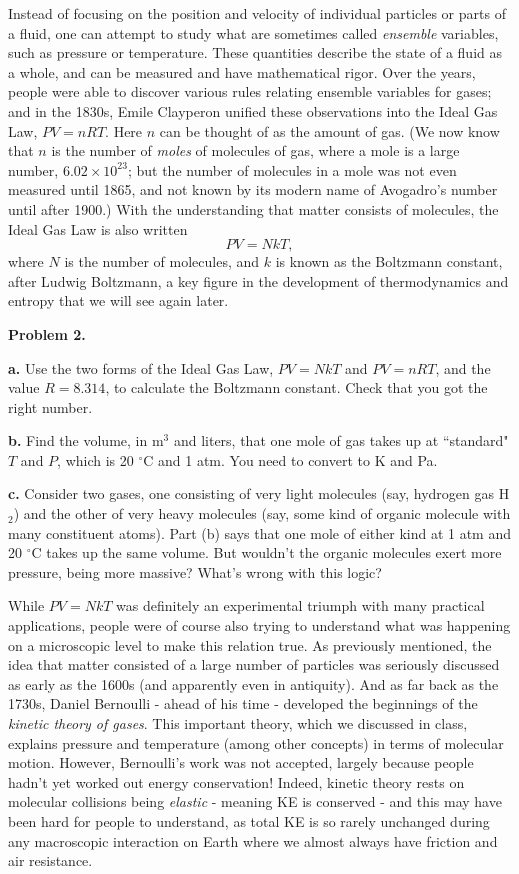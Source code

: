 \documentclass[12pt]{article}
\begin{document}
Instead of focusing on the position and velocity of individual particles or parts of a fluid, one can attempt to study what are sometimes called \textit{ensemble} variables, such as pressure or temperature. These quantities describe the state of a fluid as a whole, and can be measured and have mathematical rigor.  Over the years, people were able to discover various rules relating ensemble variables for gases; and in the 1830s, Emile Clayperon unified these observations into the Ideal Gas Law, $PV=nRT$. Here $n$ can be thought of as the amount of gas. (We now know that $n$ is the number of \textit{moles} of molecules of gas, where a mole is a large number, $6.02 \times 10^{23}$; but the number of molecules in a mole was not even measured until 1865, and not known by its modern name of Avogadro's number until after 1900.) With the understanding that matter consists of molecules, the Ideal Gas Law is also written 
\begin{equation}
PV=NkT, 
\end{equation}
where $N$ is the number of molecules, and $k$ is known as the Boltzmann constant, after Ludwig Boltzmann, a key figure in the development of thermodynamics and entropy that we will see again later.

\textbf{Problem 2. }

\textbf{a.} Use the two forms of the Ideal Gas Law, $PV=NkT$ and $PV=nRT$, and the value $R=8.314$, to calculate the Boltzmann constant. Check that you got the right number.

\textbf{b.} Find the volume, in m$^3$ and liters, that one mole of gas takes up at ``standard" $T$ and $P$, which is 20 $^{\circ}$C and 1 atm. You need to convert to K and Pa.  

\textbf{c.} Consider two gases, one consisting of very light molecules (say, hydrogen gas H$_2$) and the other of very heavy molecules (say, some kind of organic molecule with many constituent atoms). Part (b) says that one mole of either kind at 1 atm and 20 $^{\circ}$C takes up the same volume. But wouldn't the organic molecules exert more pressure, being more massive? What's wrong with this logic? 

While $PV=NkT$ was definitely an experimental triumph with many practical applications, people were of course also trying to understand what was happening on a microscopic level to make this relation true. As previously mentioned, the idea that matter consisted of a large number of particles was seriously discussed as early as the 1600s (and apparently even in antiquity). And as far back as the 1730s, Daniel Bernoulli - ahead of his time -  developed the beginnings of the \textit{kinetic theory of gases}. This important theory, which we discussed in class, explains pressure and temperature (among other concepts) in terms of molecular motion. However, Bernoulli's work was not accepted, largely because people hadn't yet worked out energy conservation! Indeed, kinetic theory rests on molecular collisions being \textit{elastic} - meaning KE is conserved - and this may have been hard for people to understand, as total KE is so rarely unchanged during any macroscopic interaction on Earth where we almost always have friction and air resistance.
\end{document}
